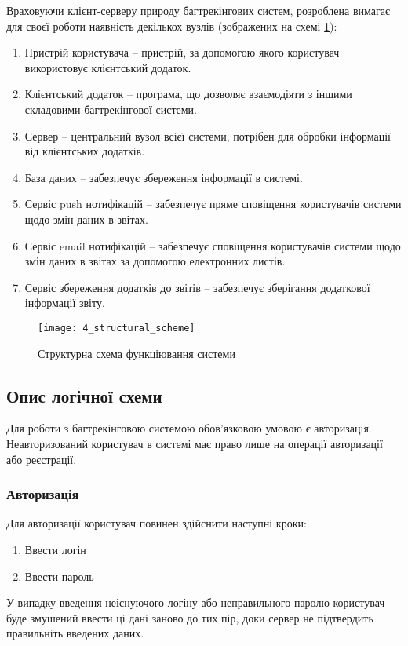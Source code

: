 \documentclass[../main.tex]{subfiles}
\begin{document}
Враховуючи клієнт-серверу природу багтрекінгових систем, розроблена вимагає для своєї роботи наявність декількох вузлів (зображених на схемі \ref{structural_scheme}):
\begin{enumerate}
	\item Пристрій користувача -- пристрій, за допомогою якого користувач використовує клієнтський додаток.
	\item Клієнтський додаток -- програма, що дозволяє взаємодіяти з іншими складовими багтрекінгової системи.
	\item Сервер -- центральний вузол всієї системи, потрібен для обробки інформації від клієнтських додатків.
	\item База даних -- забезпечує збереження інформації в системі.
	\item Сервіс push нотифікацій -- забезпечує пряме сповіщення користувачів системи щодо змін даних в звітах.
	\item Сервіс email нотифікацій -- забезпечує сповіщення користувачів системи щодо змін даних в звітах за допомогою електронних листів.
	\item Сервіс збереження додатків до звітів -- забезпечує зберігання додаткової інформації звіту.
\end{enumerate}

\begin{figure}[H]
	\centering
	\texttt{[image: 4\_structural\_scheme]}
	\caption{Структурна схема функціювання системи}
	\label{structural_scheme}
\end{figure}

\subsection{Опис логічної схеми}

Для роботи з багтрекінговою системою обов'язковою умовою є авторизація. Неавторизований користувач в системі має право лише на операції авторизації або реєстрації.

\subsubsection{Авторизація}
Для авторизації користувач повинен здійснити наступні кроки:
\begin{enumerate}
	\item Ввести логін
	\item Ввести пароль
\end{enumerate}

У випадку введення неіснуючого логіну або неправильного паролю користувач буде змушений ввести ці дані заново до тих пір, доки сервер не підтвердить правильніть введених даних.
\end{document}
